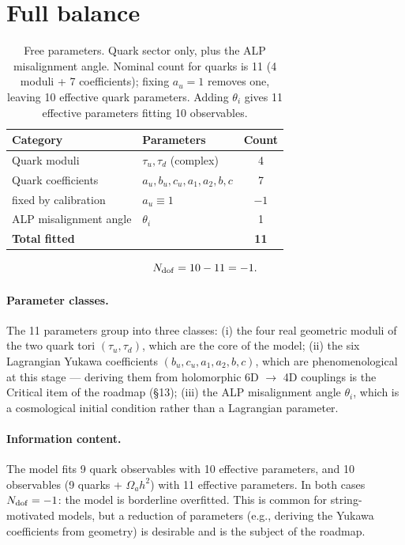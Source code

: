 \documentclass[12pt,a4paper]{article}
\numberwithin{equation}{section}
\begin{document}
\section{Full balance}
\begin{table}[H]
\centering
\caption{Free parameters. Quark sector only, plus the ALP misalignment angle. Nominal count for quarks is 11 (4 moduli + 7 coefficients); fixing \(a_u = 1\) removes one, leaving 10 effective quark parameters. Adding \(\theta_i\) gives 11 effective parameters fitting 10 observables.}
\begin{tabular}{llc}
\toprule
Category & Parameters & Count \\
\midrule
Quark moduli & \(\tau_u, \tau_d\) (complex) & 4 \\
Quark coefficients & \(a_u, b_u, c_u, a_1, a_2, b, c\) & 7 \\
\quad fixed by calibration & \(a_u \equiv 1\) & \(-1\) \\
ALP misalignment angle & \(\theta_i\) & 1 \\
\midrule
\textbf{Total fitted} & & \textbf{11} \\
\bottomrule
\end{tabular}
\end{table}
\begin{equation}
N_{\rm dof} = 10 - 11 = -1.
\end{equation}

\paragraph{Parameter classes.}
The 11 parameters group into three classes: (i) the four real geometric moduli of the two quark tori \((\tau_u, \tau_d)\), which are the core of the model; (ii) the six Lagrangian Yukawa coefficients \((b_u, c_u, a_1, a_2, b, c)\), which are phenomenological at this stage --- deriving them from holomorphic 6D \(\to\) 4D couplings is the Critical item of the roadmap (\S13); (iii) the ALP misalignment angle \(\theta_i\), which is a cosmological initial condition rather than a Lagrangian parameter.

\paragraph{Information content.}
The model fits 9 quark observables with 10 effective parameters, and 10 observables (9 quarks + \(\Omega_a h^2\)) with 11 effective parameters. In both cases \(N_{\rm dof} = -1\): the model is borderline overfitted. This is common for string-motivated models, but a reduction of parameters (e.g., deriving the Yukawa coefficients from geometry) is desirable and is the subject of the roadmap.
\end{document}
